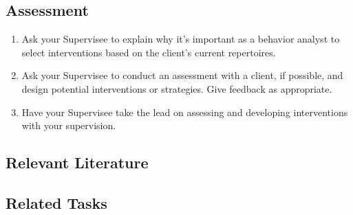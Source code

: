 \subsection{Assessment}
\begin{enumerate}
\item Ask your Supervisee to explain why it's important as a behavior analyst to select interventions based on the client's current repertoires. 
\item Ask your Supervisee to conduct an assessment with a client, if possible, and design potential interventions or strategies. Give feedback as appropriate.
\item Have your Supervisee take the lead on assessing and developing interventions with your supervision. 
%
\end{enumerate}
%
\subsection{Relevant Literature}
\begin{refsection}
\nocite{test,alang2017police,clayton2018black}
\printbibliography[heading=none]
\end{refsection}
%
\subsection{Related Tasks}
\fourdNine{}\\
\fourgThree{}\\
\fouriThree{}\\
\fourjThree{}\\
\fouriFour{}\\
\fourjTwo{}\\
\fourjSix{}\\
\fourjSeven{}\\
\fourjEight{}\\
%
%
%
%
%
%
%
%
\section[\fourjSix{}]{\fourjSix{}%
              }
